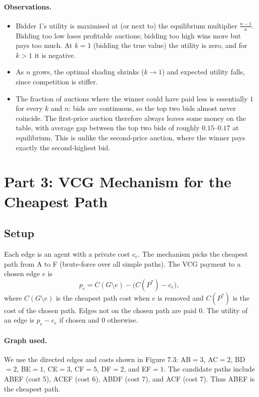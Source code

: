\documentclass[11pt,a4paper]{article}
\begin{document}
\paragraph{Observations.}
\begin{itemize}
\item Bidder 1's utility is maximised at (or next to) the equilibrium multiplier $\frac{n-1}{n}$. Bidding too low loses profitable auctions; bidding too high wins more but pays too much. At $k=1$ (bidding the true value) the utility is zero, and for $k>1$ it is negative.
\item As $n$ grows, the optimal shading shrinks ($k\to1$) and expected utility falls, since competition is stiffer.
\item The fraction of auctions where the winner could have paid less is essentially $1$ for every $k$ and $n$: bids are continuous, so the top two bids almost never coincide. The first-price auction therefore always leaves some money on the table, with average gap between the top two bids of roughly $0.15$--$0.17$ at equilibrium. This is unlike the second-price auction, where the winner pays exactly the second-highest bid.
\end{itemize}

\section{Part 3: VCG Mechanism for the Cheapest Path}

\subsection{Setup}
Each edge is an agent with a private cost $c_e$. The mechanism picks the cheapest path from A to F (brute-force over all simple paths). The VCG payment to a chosen edge $e$ is
\[
p_e = C(G\setminus e) - \bigl(C(P^*) - c_e\bigr),
\]
where $C(G\setminus e)$ is the cheapest path cost when $e$ is removed and $C(P^*)$ is the cost of the chosen path. Edges not on the chosen path are paid $0$. The utility of an edge is $p_e-c_e$ if chosen and $0$ otherwise.

\paragraph{Graph used.} We use the directed edges and costs shown in Figure 7.3: AB$=3$, AC$=2$, BD$=2$, BE$=1$, CE$=3$, CF$=5$, DF$=2$, and EF$=1$. The candidate paths include ABEF (cost 5), ACEF (cost 6), ABDF (cost 7), and ACF (cost 7). Thus ABEF is the cheapest path.
\end{document}
